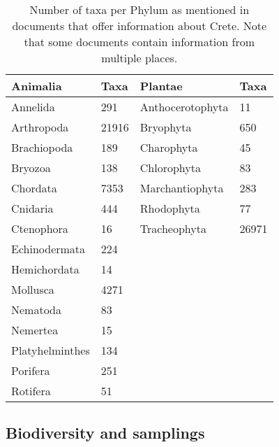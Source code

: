 \begin{longtable}{llll}
    \caption{Number of taxa per Phylum as mentioned in documents that offer information about Crete. Note that some documents contain information from multiple places. \label{table:crete_bhl_phyla}} \\
\textbf{Animalia} & \textbf{Taxa} & \textbf{Plantae} & \textbf{Taxa} \\
\endfirsthead
%
\endhead
%
Annelida          & 291           & Anthocerotophyta & 11            \\
Arthropoda        & 21916         & Bryophyta        & 650           \\
Brachiopoda       & 189           & Charophyta       & 45            \\
Bryozoa           & 138           & Chlorophyta      & 83            \\
Chordata          & 7353          & Marchantiophyta  & 283           \\
Cnidaria          & 444           & Rhodophyta       & 77            \\
Ctenophora        & 16            & Tracheophyta     & 26971         \\
Echinodermata     & 224           &                  &               \\
Hemichordata      & 14            &                  &               \\
Mollusca          & 4271          &                  &               \\
Nematoda          & 83            &                  &               \\
Nemertea          & 15            &                  &               \\
Platyhelminthes   & 134           &                  &               \\
Porifera          & 251           &                  &               \\
Rotifera          & 51            &                  &              
\end{longtable}

\subsection{Biodiversity and samplings}

